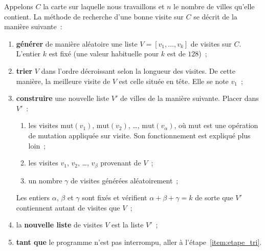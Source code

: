 \documentclass[12pt]{article}
\theoremstyle{definition}
\newcommand{\Mut}{\mathrm{mut}}
\begin{document}
Appelons $C$ la carte sur laquelle nous travaillons et $n$ le nombre de
villes qu'elle contient. La méthode de recherche d'une bonne visite sur
$C$ se décrit de la manière suivante~:
\begin{enumerate}
    \item {\bf générer} de manière aléatoire une liste $V = [v_1, \dots, v_k]$
    de visites sur $C$. L'entier $k$ est fixé (une valeur habituelle pour
    $k$ est de $128$)~;
    \smallskip

    \item \label{item:etape_tri}
    {\bf trier} $V$ dans l'ordre décroissant selon la longueur des visites.
    De cette manière, la meilleure visite de $V$ est celle située en
    tête. Elle se note $v_1$~;
    \smallskip

    \item {\bf construire} une nouvelle liste $V'$ de villes de la manière
    suivante. Placer dans $V'$~:
    \begin{enumerate}
        \item les visites $\Mut(v_1)$, $\Mut(v_2)$, \dots,
        $\Mut(v_{\alpha})$, où $\Mut$ est une opération de mutation
        appliquée sur visite. Son fonctionnement est expliqué plus loin~;
        \item les visites $v_1$, $v_2$, \dots, $v_\beta$ provenant de $V$~;
        \item un nombre $\gamma$ de visites générées aléatoirement~;
    \end{enumerate}
    Les entiers $\alpha$, $\beta$ et $\gamma$ sont fixés et vérifient
    $\alpha + \beta + \gamma = k$ de sorte que $V'$ contiennent autant
    de visites que $V$~;
    \smallskip

    \item la {\bf nouvelle liste} de visites $V$ est la liste $V'$~;
    \smallskip

    \item {\bf tant que} le programme n'est pas interrompu, aller à
    l'étape~\ref{item:etape_tri}.
\end{enumerate}
\medskip
\end{document}

